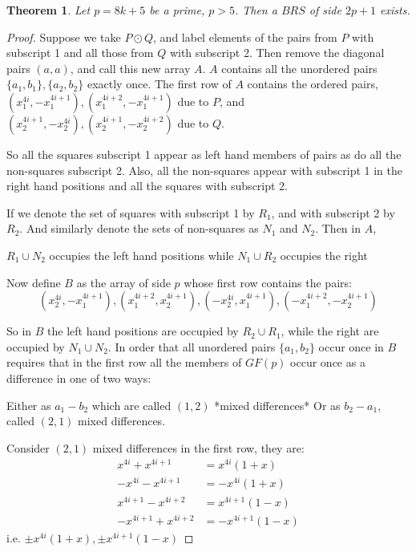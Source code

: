 \documentclass[
  11pt,
  a4paper]{book}
\newtheorem{theorem}{Theorem}
\begin{document}
\begin{theorem}
Let $p = 8k + 5$ be a prime, $p > 5$. Then a $BRS$ of side
$2p + 1$ exists.
\end{theorem}
\begin{proof}
Suppose we take $P \odot Q$, and label elements of the pairs
from $P$ with subscript 1 and all those from $Q$ with
subscript 2. Then remove the diagonal pairs $(a, a)$, and
call this new array $A$. $A$ contains all the unordered
pairs $\{a_1, b_1\},\{a_2, b_2\}$ exactly once. The first row
of $A$ contains the ordered pairs,
$(x_1^{4i}, -x_1^{4i + 1}), (x_1^{4i + 2}, -x_1^{4i + 1})$
due to $P$, and
$(x_2^{4i + 1}, -x_2^{4i}), (x_2^{4i + 1}, -x_2^{4i  +2})$
due to $Q$.

So all the squares subscript 1 appear as left hand members
of pairs as do all the non-squares subscript 2. Also, all
the non-squares appear with subscript 1 in the right hand
positions and all the squares with
subscript 2.

If we denote the set of squares with subscript 1 by $R_1$,
and with subscript 2 by $R_2$. And similarly denote the sets
of non-squares as $N_1$ and $N_2$. Then in $A$,

$R_1 \cup N_2$ occupies the left hand positions
while $N_1 \cup R_2$ occupies the right

Now define $B$ as the array of side $p$ whose first row
contains the pairs:
\begin{equation}
(x_2^{4i}, -x_1^{4i + 1}), (x_1^{4i + 2}, x_2^{4i + 1}), (-x_2^{4i}, x_1^{4i + 1}), (-x_1^{4i + 2}, -x_2^{4i + 1})
\end{equation}

So in $B$ the left hand positions are occupied by
$R_2 \cup R_1$, while the right are occupied by
$N_1 \cup N_2$.  In order that all unordered pairs
$\{a_1, b_2\}$ occur once in $B$ requires that in the first
row all the members of $GF(p)$ occur once as a difference
in one of two ways:

Either as $a_1 - b_2$ which are called $(1, 2)$
*mixed differences* Or as $b_2 - a_1$, called $(2, 1)$
mixed differences.

Consider $(2, 1)$ mixed differences in the first row, they
are:
\begin{align*}
       x^{4i} + x^{4i + 1} &= x^{4i}(1 + x)      \\
      -x^{4i} - x^{4i + 1} &=-x^{4i}(1 + x)      \\
   x^{4i + 1} - x^{4i + 2} &= x^{4i + 1}(1 - x)  \\
  -x^{4i + 1} + x^{4i + 2} &= -x^{4i + 1}(1 - x)
\end{align*}
i.e. $\pm x^{4i}(1 + x), \pm x^{4i + 1}(1 - x)$


\end{proof}
\end{document}
